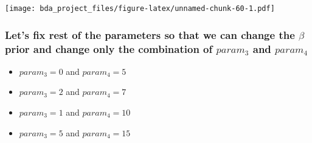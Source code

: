 \documentclass[
]{article}
\providecommand{\tightlist}{%
  \setlength{\itemsep}{0pt}\setlength{\parskip}{0pt}}
\begin{document}
\texttt{[image: bda\_project\_files/figure-latex/unnamed-chunk-60-1.pdf]}

\hypertarget{lets-fix-rest-of-the-parameters-so-that-we-can-change-the-beta-prior-and-change-only-the-combination-of-param_3-and-param_4}{%
\subsubsection{\texorpdfstring{Let's fix rest of the parameters so that
we can change the \(\beta\) prior and change only the combination of
\(param_3\) and
\(param_4\)}{Let's fix rest of the parameters so that we can change the \textbackslash beta prior and change only the combination of param\_3 and param\_4}}\label{lets-fix-rest-of-the-parameters-so-that-we-can-change-the-beta-prior-and-change-only-the-combination-of-param_3-and-param_4}}

\begin{itemize}
\tightlist
\item
  \(param_3 = 0\) and \(param_4 = 5\)
\item
  \(param_3 = 2\) and \(param_4 = 7\)
\item
  \(param_3 = 1\) and \(param_4 = 10\)
\item
  \(param_3 = 5\) and \(param_4 = 15\)
\end{itemize}
\end{document}
